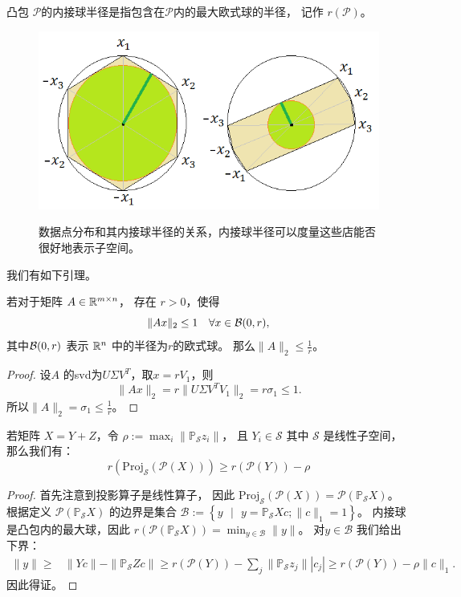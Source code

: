 \documentclass[main.tex]{subfiles}
\begin{document}
\begin{definition}[内接球半径]
凸包 $\mathcal{P}$的内接球半径是指包含在$\mathcal{P}$内的最大欧式球的半径，
记作 $r(\mathcal{P})$。 
\end{definition}

\begin{figure}
  \centering
  \includegraphics[width=0.7\linewidth]{pics/inradius.png}\\
  \caption{数据点分布和其内接球半径的关系，内接球半径可以度量这些店能否很好地表示子空间。}
  \label{fig:inradius}
\end{figure}

我们有如下引理。

\begin{lemma}\label{lemma:circum_inradius}
  若对于矩阵 $A \in \mathbb{R}^{m \times n}$， 存在 $r>0$，使得
  $$\|Ax\|_2 \leq 1 \quad \forall x \in \mathcal{B}(0, r),$$
  其中$\mathcal{B}(0, r)$ 表示 $\mathbb{R}^n$ 中的半径为$r$的欧式球。
  那么$\|A\|_2 \leq \frac{1}{r}$。
\end{lemma}
\begin{proof}
  设$A$ 的svd为$U\Sigma V^T$，取$x=rV_1$，则
  $$\|Ax\|_2 = r \|U \Sigma V^T V_1\|_2 = r \sigma_1 \leq 1.$$
  所以$\|A\|_2 = \sigma_1 \leq \frac{1}{r}$。
\end{proof}

\begin{lemma}\label{lemma:Y_containing_set}
  若矩阵 $X=Y+Z$，令 $\rho:=\max_{i}\|\mathbb{P}_\mathcal{S}z_i\|$， 且 $Y_i \in \mathcal{S}$ 其中
  $\mathcal{S}$ 是线性子空间， 那么我们有：
  \begin{equation*}
    r(\mathrm{Proj}_\mathcal{S} (\mathcal{P}(X))) \geq r(\mathcal{P}(Y)) - \rho
  \end{equation*}
\end{lemma}
\begin{proof}
  首先注意到投影算子是线性算子， 因此 $\mathrm{Proj}_\mathcal{S}(\mathcal{P}(X))=\mathcal{P}(\mathbb{P}_\mathcal{S} X)$。
  根据定义 $\mathcal{P}(\mathbb{P}_\mathcal{S} X)$ 的边界是集合 $\mathcal{B}:=
  \left\{y\text{ }|\text{ }y=\mathbb{P}_\mathcal{S} X c; \|c\|_1=1\right\}$。
  内接球是凸包内的最大球，因此 $r(\mathcal{P}(\mathbb{P}_\mathcal{S} X)) =
  \min_{y\in \mathcal{B}} \|y\|$。 对$y \in \mathcal{B} $ 我们给出下界：
  \begin{align*}
    \|y\| \geq& \|Yc\|-\|\mathbb{P}_\mathcal{S}Z c\|\geq r(\mathcal{P}(Y)) - {\sum}_j{\|\mathbb{P}_\mathcal{S}z_j}\||c_j|
    \geq r(\mathcal{P}(Y)) - \rho\|c\|_1.
  \end{align*}
  因此得证。
\end{proof}
\end{document}
